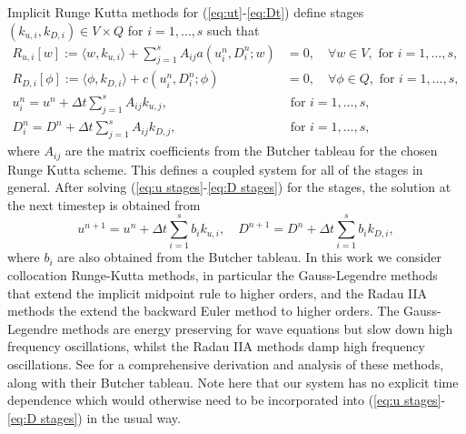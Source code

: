 \documentclass[a4paper, 12pt]{article}
\begin{document}
Implicit Runge Kutta methods for (\ref{eq:ut}-\ref{eq:Dt}) define
stages $(k_{u,i}, k_{D,i})\in V\times Q$ for $i=1,\ldots,s$ such that
\begin{align}
    \label{eq:u stages}
    R_{u,i}[w] := \langle w, k_{u,i} \rangle + \sum_{j=1}^sA_{ij}a\left(
    u^n_i,D^n_i;w\right)
  & = 0,  
  \quad \forall w \in V,\mbox{ for }i=1,\ldots,s, \\
  \label{eq:D stages}
  R_{D,i}[\phi] := \langle \phi, k_{D,i} \rangle + c\left(u^n_i,D^n_i; \phi\right)
  & = 0, \quad \forall \phi \in Q, \mbox{ for }i=1,\ldots,s,\\
  u^n_i = u^n + \Delta t\sum_{j=1}^sA_{ij}k_{u,j}, & \mbox{ for }i=1,\ldots,s,\\
  D^n_i = D^n + \Delta t\sum_{j=1}^sA_{ij}k_{D,j}, & \mbox{ for }i=1,\ldots,s,
\end{align}
where $A_{ij}$ are the matrix coefficients from the Butcher
tableau for the chosen Runge Kutta scheme. This defines a coupled
system for all of the stages in general. After solving
(\ref{eq:u stages}-\ref{eq:D stages}) for the stages, the solution
at the next timestep is obtained from
\begin{equation}
  u^{n+1} = u^n + \Delta t\sum_{i=1}^sb_i k_{u,i},\quad
  D^{n+1} = D^n + \Delta t\sum_{i=1}^sb_i k_{D,i},
\end{equation}
where $b_i$ are also obtained from the Butcher tableau. In this work
we consider collocation Runge-Kutta methods, in particular the
Gauss-Legendre methods that extend the implicit midpoint rule to
higher orders, and the Radau IIA methods the extend the backward Euler
method to higher orders. The Gauss-Legendre methods are energy
preserving for wave equations but slow down high frequency
oscillations, whilst the Radau IIA methods damp high frequency
oscillations.  See \citet{wanner1996solving} for a comprehensive
derivation and analysis of these methods, along with their Butcher
tableau. Note here that our system has no explicit time dependence
which would otherwise need to be incorporated into (\ref{eq:u
  stages}-\ref{eq:D stages}) in the usual way.
\end{document}

